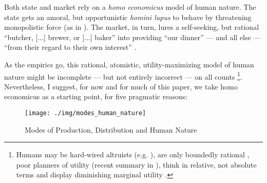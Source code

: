 \documentclass[11pt,a4paper,oneside,openright]{article}
\begin{document}
\begin{enumerate}
	Both state and market rely on a \emph{homo economicus} model of human nature. 
	The state gets an amoral, but opportunistic \emph{homini lupus} to behave by threatening monopolistic force (as in \citealt{Hobbes-1651-aa}). 
	The market, in turn, lures a self-seeking, but rational ``butcher, [...] brewer, or [...] baker'' into providing ``our dinner'' --- and all else --- ``from their regard to their own interest'' \citep{Smith-1776-lq}.

	As the empirics go, this rational, atomistic, utility-maximizing model of human nature might be incomplete --- but not entirely incorrect --- on all counts
	\footnote{
		Humans may be hard-wired altruists (e.g. \citealt{Zak2004}), are only boundedly rational \citep{Simon-1999-aa,Kahneman2011}, poor planners of utility (recent summary in \citealt{Gilbert2006}), think in relative, not absolute terms \citep{Frank2005} and display diminishing marginal utility \citep{Ng-1997-aa,Veenhoven-2000-aa,Nickell2008}.
	}. 
	Nevertheless, I suggest, for now and for much of this paper, we take homo economicus as a starting point, for five pragmatic reasons:%
	
	
\begin{figure}[htbp]
	\centering
	\texttt{[image: ./img/modes\_human\_nature]}  
	\caption{Modes of Production, Distribution and Human Nature}
	\label{fig:modes_human_nature}
\end{figure} 


\end{enumerate}
\end{document}
